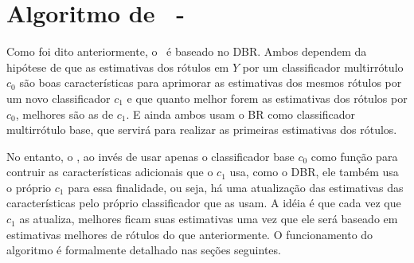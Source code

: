 \section{Algoritmo de \MRLM~-~\MRLMa}
\label{sec:mrlm_algo}
Como foi dito anteriormente, o \MRLM~é baseado no DBR. 
Ambos dependem da hipótese de que as estimativas dos rótulos em $Y$ por um classificador multirrótulo $c_0$
são boas características para aprimorar as estimativas dos mesmos rótulos por um novo classificador $c_1$
e que quanto melhor forem as estimativas dos rótulos por $c_0$, melhores são as de $c_1$.
E ainda ambos usam o BR como classificador multirrótulo base, que servirá para realizar as primeiras estimativas dos 
rótulos.

No entanto, o \MRLMa, ao invés de usar apenas o classificador base $c_0$ como função para contruir
as características adicionais que o $c_1$ usa, como o DBR,
ele também usa o próprio $c_1$ para essa finalidade, ou seja, há uma atualização das estimativas das características
pelo próprio classificador que as usam.
A idéia é que cada vez que $c_1$ as atualiza, melhores ficam suas estimativas uma vez que ele será baseado
em estimativas melhores de rótulos do que anteriormente. 
O funcionamento do algoritmo é formalmente detalhado nas seções seguintes.

